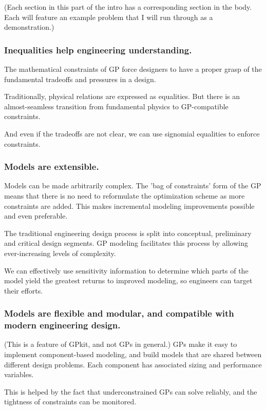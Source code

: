 \documentclass{aiaa-pretty}
\begin{document}
(Each section in this part of the intro has a corresponding section in the body. Each will feature an example problem that I will run through as a demonstration.) 

\subsubsection{Inequalities help engineering understanding.}
The mathematical constraints of \gls{GP} force designers to have a proper grasp of the fundamental tradeoffs and pressures in a design.

Traditionally, physical relations are expressed as equalities. But there is an almost-seamless transition from fundamental physics to GP-compatible constraints.

And even if the tradeoffs are not clear, we can use signomial equalities to enforce constraints. 

\subsubsection{Models are extensible.}
Models can be made arbitrarily complex. The 'bag of constraints' form of the GP means that there is no need to reformulate the optimization scheme as more constraints are added. This makes incremental modeling improvements possible and even preferable. 

The traditional engineering design process is split into conceptual, preliminary and critical design segments. GP modeling facilitates this process by allowing ever-increasing levels of complexity.

We can effectively use sensitivity information to determine which parts of the model yield the greatest returns to improved modeling, so engineers can target their efforts. 

\subsubsection{Models are flexible and modular, and compatible with modern engineering design.}
(This is a feature of GPkit, and not GPs in general.)
\gls{GP}s make it easy to implement component-based modeling, and build models that are shared between different design problems. Each component has associated sizing and performance variables. 

This is helped by the fact that underconstrained \gls{GP}s can solve reliably, and the tightness of constraints can be monitored. 
\end{document}

